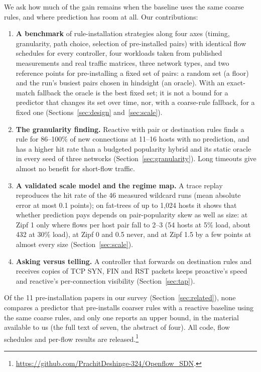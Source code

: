 \documentclass[sigconf]{acmart}
\begin{document}
We ask how much of the gain remains when the baseline uses the same coarse rules, and where prediction has room at all. Our contributions:
\begin{enumerate}
\item \textbf{A benchmark} of rule-installation strategies along four axes (timing, granularity, path choice, selection of pre-installed pairs) with identical flow schedules for every controller, four workloads taken from published measurements and real traffic matrices, three network types, and two reference points for pre-installing a fixed set of pairs: a random set (a floor) and the run's busiest pairs chosen in hindsight (an oracle). With an exact-match fallback the oracle is the best fixed set; it is not a bound for a predictor that changes its set over time, nor, with a coarse-rule fallback, for a fixed one (Sections~\ref{sec:design} and~\ref{sec:scale}).
\item \textbf{The granularity finding.} Reactive with pair or destination rules finds a rule for 86--100\% of new connections at 11--16 hosts with no prediction, and has a higher hit rate than a budgeted popularity hybrid and its static oracle in every seed of three networks (Section~\ref{sec:granularity}). Long timeouts give almost no benefit for short-flow traffic.
\item \textbf{A validated scale model and the regime map.} A trace replay reproduces the hit rate of the 46 measured wildcard runs (mean absolute error at most 0.1 points); on fat-trees of up to 1,024 hosts it shows that whether prediction pays depends on pair-popularity skew as well as size: at Zipf 1 only where flows per host pair fall to 2--3 (54 hosts at 5\% load, about 432 at 30\% load), at Zipf 0 and 0.5 never, and at Zipf 1.5 by a few points at almost every size (Section~\ref{sec:scale}).
\item \textbf{Asking versus telling.} A controller that forwards on destination rules and receives copies of TCP SYN, FIN and RST packets keeps proactive's speed and reactive's per-connection visibility (Section~\ref{sec:tap}).
\end{enumerate}
Of the 11 pre-installation papers in our survey (Section~\ref{sec:related}), none compares a predictor that pre-installs coarser rules with a reactive baseline using the same coarse rules, and only one reports an upper bound, in the material available to us (the full text of seven, the abstract of four). All code, flow schedules and per-flow results are released.\footnote{\url{https://github.com/PrachitDeshinge-324/Openflow_SDN}.}
\end{document}
